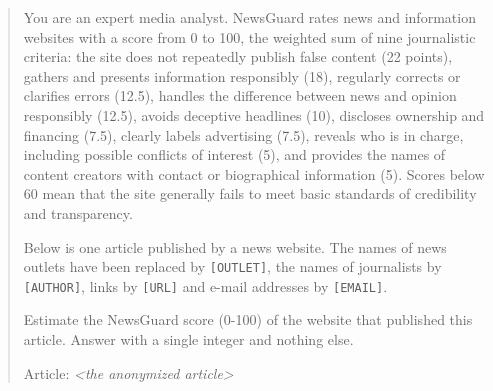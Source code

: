 \documentclass[11pt,a4paper]{article}
\begin{document}
\begin{quote}\small
You are an expert media analyst. NewsGuard rates news and information websites with a score from 0 to 100, the weighted sum of nine journalistic criteria: the site does not repeatedly publish false content (22 points), gathers and presents information responsibly (18), regularly corrects or clarifies errors (12.5), handles the difference between news and opinion responsibly (12.5), avoids deceptive headlines (10), discloses ownership and financing (7.5), clearly labels advertising (7.5), reveals who is in charge, including possible conflicts of interest (5), and provides the names of content creators with contact or biographical information (5). Scores below 60 mean that the site generally fails to meet basic standards of credibility and transparency.

\smallskip\noindent Below is one article published by a news website. The names of news outlets have been replaced by \texttt{[OUTLET]}, the names of journalists by \texttt{[AUTHOR]}, links by \texttt{[URL]} and e-mail addresses by \texttt{[EMAIL]}.

\smallskip\noindent Estimate the NewsGuard score (0-100) of the website that published this article. Answer with a single integer and nothing else.

\smallskip\noindent Article:
\emph{<the anonymized article>}
\end{quote}
\end{document}

